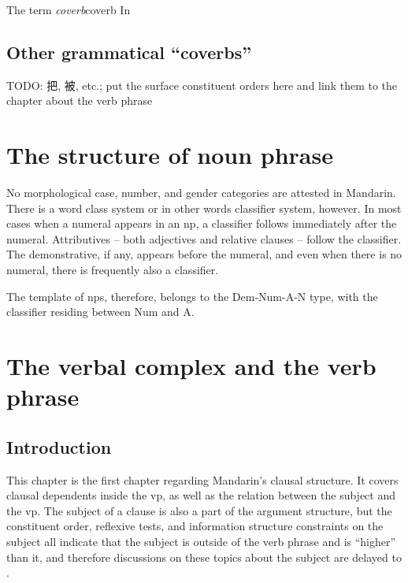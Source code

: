 \documentclass[UTF8, a4paper, oneside, scheme=plain, 12pt]{ctexrep}
\newcommand*{\term}[1]{\emph{#1}}
\begin{document}
\begin{infobox}{The term \term{coverb}}{coverb}
    In 
\end{infobox}

\section{Other grammatical ``coverbs''}

TODO: 把, 被, etc.; put the surface constituent orders here 
and link them to the chapter about the verb phrase

\chapter{The structure of noun phrase}

No morphological case, number, and gender categories are attested in Mandarin.
There is a word class system or in other words classifier system, however.
In most cases when a numeral appears in an \ac{np},
a classifier follows immediately after the numeral.
Attributives -- both adjectives and relative clauses -- 
follow the classifier. %
The demonstrative, if any, appears before the numeral,
and even when there is no numeral,
there is frequently also a classifier.

The template of \ac{np}s, therefore, belongs to the 
Dem-Num-A-N type,
with the classifier residing between Num and A. 


\chapter{The verbal complex and the verb phrase}\label{chap:verbal-complex}

\section{Introduction}

This chapter is the first chapter regarding Mandarin's clausal structure.
It covers clausal dependents inside the \acs{vp},
as well as the relation between the subject and the \acs{vp}.
The subject of a clause is also a part of the argument structure,
but the constituent order,
reflexive tests,
and information structure constraints on the subject
all indicate that the subject is outside of the verb phrase 
and is ``higher'' than it,
and therefore discussions on these topics about the subject 
are delayed to .
\end{document}
